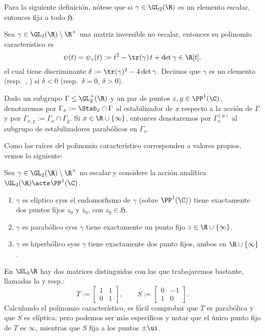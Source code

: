 \documentclass[teoria-numeros.tex]{subfiles}
\begin{document}
Para la siguiente definición, nótese que si $\gamma \in \GL_2(\R)$ es un elemento escalar, entonces fija a todo $\mathfrak{H}$.
\begin{mydef}
	Sea $\gamma
	\in \GL_2(\R) \setminus \R^\times$ una matriz inversible no escalar, entonces su polinomio característico es
	\[
		\psi(t) = \psi_\gamma(t) := t^2 - \tr(\gamma) \, t + \det\gamma \in \R[t].
	\]
	el cual tiene discriminante $\delta := \tr(\gamma)^2 - 4\det\gamma$.
	Decimos que $\gamma$ es un elemento 
	(resp.\ , )
	si $\delta < 0$ (resp.\ $\delta = 0$, $\delta > 0$).

	Dado un subgrupo $\Gamma \le \GL_2^+(\R)$ y un par de puntos $x, y \in \PP^1(\C)$,
	denotaremos por $\Gamma_x := \Stab_x \cap \Gamma$ al estabilizador de $x$ respecto a la acción de $\Gamma$
	y por $\Gamma_{x, y} := \Gamma_x \cap \Gamma_y$.
	Si $x \in \R \cup \{ \infty \}$, entonces denotaremos por $\Gamma_x^{(p)}$ al subgrupo de estabilizadores parabólicos en $\Gamma_x$.
\end{mydef}
Como las raíces del polinomio característico corresponden a valores propios, vemos lo siguiente:
\begin{cor}
	Sea $\gamma \in \GL_2(\R) \setminus \R^\times$ no escalar y considere la acción analítica $\GL_2(\R) \acts \PP^1(\C)$.
	\begin{enumerate}
		\item $\gamma$ es elíptico syss el endomorfismo de $\gamma$ (sobre $\PP^1(\C)$) tiene exactamente dos puntos fijos $z_0$ y $\overline{z}_0$,
			con $z_0 \in \mathfrak{H}$.
		\item $\gamma$ es  parabólico syss $\gamma$ tiene exactamente  un punto fijo      $z \in \R \cup \{ \infty \}$.
		\item $\gamma$ es hiperbólico syss $\gamma$ tiene exactamente dos punto fijos, ambos en $\R \cup \{ \infty \}$.
	\end{enumerate}
\end{cor}
\begin{ex}
	En $\SL_2\R$ hay dos matrices distinguidas con las que trabajaremos bastante,
	llamadas la  y  resp.:
	\[
		T :=
		\begin{bmatrix}
			1 & 1 \\
			0 & 1
		\end{bmatrix}, \qquad
		S :=
		\begin{bmatrix}
			0 & -1 \\
			1 & 0
		\end{bmatrix}.
	\]
	Calculando el polinomio característico, es fácil comprobar que $T$ es parabólica y que $S$ es elíptica;
	pero podemos ser más específicos y notar que el único punto fijo de $T$ es $\infty$, mientras que $S$ fija a los puntos $\pm\ui$.
\end{ex}
\end{document}
